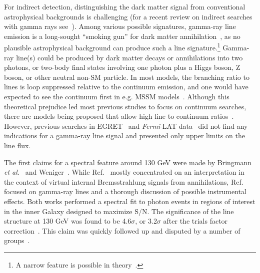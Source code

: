\documentclass[aps,prd,superscriptaddress,showpacs,nofootinbib,fixlfloat, 12pt]{revtex4-1}
\newcommand{\Fermi}{{\slshape Fermi}}
\begin{document}
For indirect detection, distinguishing the dark matter
signal from conventional astrophysical backgrounds is
challenging
(for a recent review on indirect searches with gamma rays
see~\cite{Bringmann:2012ez}).
Among various possible signatures, gamma-ray
line emission is a long-sought ``smoking
gun'' for dark matter annihilation~\cite{Bergstrom:1988fp}, as no plausible
astrophysical background can produce such a line
signature.\footnote{A narrow feature is
possible in theory~\citep[see][]{2012arXiv1207.0458A}.}  Gamma-ray line(s)
could be produced by dark matter decays or annihilations
into two photons, or two-body final states involving one
photon plus a Higgs boson, Z boson, or other neutral non-SM
particle.  In most models, the branching ratio
to lines is loop suppressed relative to the continuum
emission, and one would have expected to see the continuum
first in e.g. MSSM models~\citep[e.g.][]{Bergstrom:1997}.
Although this theoretical prejudice led most previous
studies to focus on continuum searches, there are models
being proposed that allow high line to continuum
ratios~\citep[e.g.][]{Bergstrom:1998, Bergstrom:2000,
Bertone:2009, Jackson:2010, Cline:2012, Weiner:2012}.
However, previous searches in EGRET~\cite{Pullen:2006sy} and \Fermi-LAT
data~\cite{Abdo:2010nc, Vertongen:2011mu, Ackermann:2012qk}
did not find any
indications for a gamma-ray line signal and presented only upper limits on the
line flux.

The first claims for a spectral feature around 130 GeV were made by Bringmann
\textit{et al.}~\citep{Bringmann:2012} and Weniger~\citep{Weniger:2012}. While
Ref.~\citep{Bringmann:2012} mostly concentrated on an interpretation in the context of
virtual internal Bremsstrahlung signals from annihilations,
Ref.~\citep{Weniger:2012} focused on gamma-ray lines and a thorough discussion
of possible instrumental effects.  Both works performed a spectral fit to
photon events in regions of interest in
the inner Galaxy designed to maximize S/N. The significance of the line structure
at 130 GeV was found to be 4.6$\sigma$, or 3.2$\sigma$ after the trials factor
correction~\citep{Weniger:2012}.
This claim was quickly followed up and disputed by a number of
groups~\cite{tempel:2012ey, Boyarsky:2012ca}.
\end{document}
